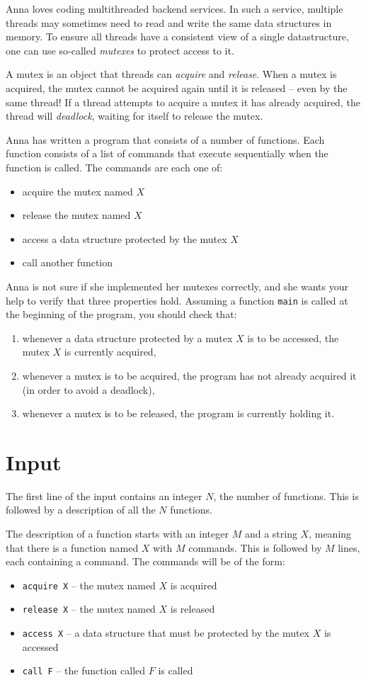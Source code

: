 Anna loves coding multithreaded backend services.
In such a service, multiple threads may sometimes need to read and write the same data structures in memory.
To ensure all threads have a consistent view of a single datastructure, one can use so-called \emph{mutexes} to protect access to it.

A mutex is an object that threads can \emph{acquire} and \emph{release}.
When a mutex is acquired, the mutex cannot be acquired again until it is released -- even by the same thread!
If a thread attempts to acquire a mutex it has already acquired, the thread will \emph{deadlock}, waiting for itself to release the mutex.

Anna has written a program that consists of a number of functions.
Each function consists of a list of commands that execute sequentially when the function is called.
The commands are each one of:
\begin{itemize}
  \item acquire the mutex named $X$
  \item release the mutex named $X$
  \item access a data structure protected by the mutex $X$
  \item call another function
\end{itemize}

Anna is not sure if she implemented her mutexes correctly, and she wants your help to verify that three properties hold.
Assuming a function \texttt{main} is called at the beginning of the program, you should check that:
\begin{enumerate}
  \item whenever a data structure protected by a mutex $X$ is to be accessed, the mutex $X$ is currently acquired,
  \item whenever a mutex is to be acquired, the program has not already acquired it (in order to avoid a deadlock),
  \item whenever a mutex is to be released, the program is currently holding it.
\end{enumerate}

\section*{Input}
The first line of the input contains an integer $N$, the number of functions.
This is followed by a description of all the $N$ functions.

The description of a function starts with an integer $M$ and a string $X$, meaning that there is a function named $X$ with $M$ commands.
This is followed by $M$ lines, each containing a command.
The commands will be of the form:
\begin{itemize}
  \item \texttt{acquire X} -- the mutex named $X$ is acquired
  \item \texttt{release X} -- the mutex named $X$ is released
  \item \texttt{access X} -- a data structure that must be protected by the mutex $X$ is accessed
  \item \texttt{call F} -- the function called $F$ is called
\end{itemize}

